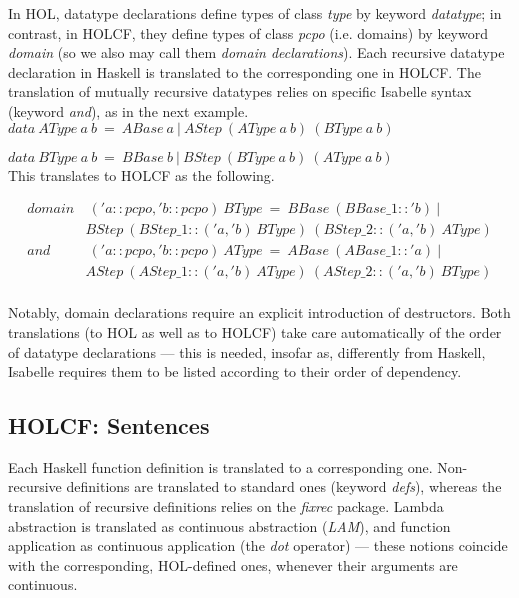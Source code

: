 \documentclass[a4paper,12pt]{article}
\begin{document}
\noindent In HOL, datatype declarations define types of class
\emph{type} by keyword \emph{datatype}; in contrast, in HOLCF, they
define types of class \emph{pcpo} (i.e. domains) by keyword
\emph{domain} (so we also may call them \emph{domain declarations}).
Each recursive datatype declaration in Haskell is translated to the
corresponding one in HOLCF. The translation of mutually recursive
datatypes relies on specific Isabelle syntax (keyword
\emph{and}), as in the next example.\\

$data \ AType \ a \ b \ = \ ABase \ a \ | \ AStep \ (AType \ a \ b) \ (BType \ a \ b)  $

$data \ BType \ a \ b \ = \ BBase \ b \ | \ BStep \ (BType \ a \ b) \ (AType \ a \ b) $\\

\noindent This translates to HOLCF as the following.

$$\begin{array}{rr} domain & \ ('a::pcpo, 'b::pcpo) \ BType \ = \ BBase \ (BBase\_1::'b) \ | \\
   & BStep \ (BStep\_1::('a, 'b) \ BType) \ (BStep\_2::('a, 'b) \ AType) \\
   and & \ ('a::pcpo, 'b::pcpo) \ AType \ =  \ ABase \ (ABase\_1::'a) \ | \\
   & AStep \ (AStep\_1::('a, 'b) \ AType) \ (AStep\_2::('a, 'b) \ BType) \\
\end{array}$$

\noindent Notably, domain declarations require an explicit
introduction of destructors. Both translations (to HOL as well as to
HOLCF) take care automatically of the order of datatype declarations
--- this is needed, insofar as, differently from Haskell, Isabelle
requires them to be listed according to their order of dependency.



\subsection{HOLCF: Sentences}

Each Haskell function definition is translated to a corresponding one.
Non-recursive definitions are translated to standard ones (keyword
\emph{defs}), whereas the translation of recursive definitions relies
on the \emph{fixrec} package. Lambda abstraction is translated as
continuous abstraction (\emph{LAM}), and function application as
continuous application (the \emph{dot} operator) --- these notions
coincide with the corresponding, HOL-defined ones, whenever their
arguments are continuous.
\end{document}
